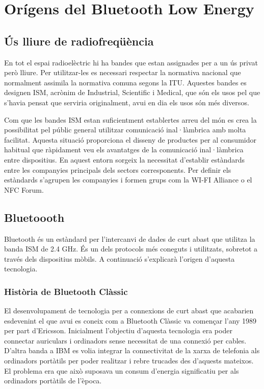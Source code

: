 \chapter{Orígens del Bluetooth Low Energy}\label{C:compaginacio}

\section{Ús lliure de radiofreqüència}
En tot el espai radioelèctric hi ha bandes que estan assignades per a un ús privat però lliure.
Per utilitzar-les es necessari respectar la normativa nacional que normalment assimila la normativa comuna segons la ITU.
Aquestes bandes es designen ISM, acrònim de Industrial, Scientific i Medical, que són els usos pel que s'havia pensat que serviria originalment, avui en dia els usos són més diversos.

Com que les bandes ISM estan suficientment establertes arreu del món es crea la possibilitat pel públic general utilitzar comunicació inal·làmbrica amb molta facilitat.
Aquesta situació proporciona el disseny de productes per al consumidor habitual que ràpidament veu els avantatges de la comunicació inal·làmbrica entre dispositius.
En aquest entorn sorgeix la necessitat d'establir estàndards entre les companyies principals dels sectors corresponents.
Per definir els estàndards s'agrupen les companyies i formen grups com la WI-FI Alliance o el NFC Forum.

\section{Bluetoooth}
Bluetooth és un estàndard per l'intercanvi de dades de curt abast que utilitza la banda ISM de 2.4 GHz.
És un dels protocols més coneguts i utilitzats, sobretot a través dels dispositius mòbils.
A continuació s'explicarà l'origen d'aquesta tecnologia.

\subsection{Història de Bluetooth Clàssic}
El desenvolupament de tecnologia per a connexions de curt abast que acabarien esdevenint el que avui es coneix com a Bluetooth Clàssic va començar l'any 1989 per part d'Ericsson.
Inicialment l'objectiu d'aquesta tecnologia era poder connectar auriculars i ordinadors sense necessitat de una connexió per cables.
D'altra banda a IBM es volia integrar la connectivitat de la xarxa de telefonia als ordinadors portàtils per poder realitzar i rebre trucades des d'aquests mateixos.
El problema era que això suposava un consum d'energia significatiu per als ordinadors portàtils de l'època.

